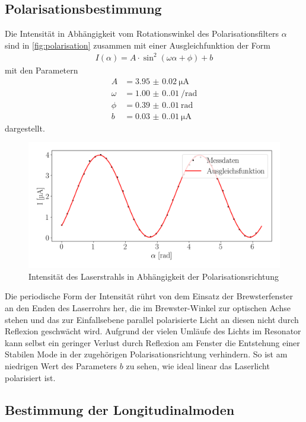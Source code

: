 \subsection{Polarisationsbestimmung}
Die Intensität in Abhängigkeit vom Rotationswinkel des Polarisationsfilters $\alpha$ sind in \autoref{fig:polarisation} zusammen mit einer Ausgleichfunktion der Form
\begin{align}
    I(\alpha)= A\cdot \sin^2{\left(\omega\alpha+\phi\right)}+b
\end{align}
mit den Parametern
\begin{align}
    A &= \SI{3.95(2)}{\micro\ampere} \\
    \omega &= \SI{1.00(0.01)}{\per\radian} \\
    \phi &= \SI{0.39(0.01)}{\radian} \\
    b &= \SI{0.03(0.01)}{\micro\ampere}
\end{align}
dargestellt.
\begin{figure}[H]
    \centering
    \includegraphics[scale=0.55]{Skripte/polarisation.png}
    \caption{Intensität des Laserstrahls in Abhängigkeit der Polarisationsrichtung}\label{fig:polarisation}
\end{figure}
Die periodische Form der Intensität rührt von dem Einsatz der Brewsterfenster an den Enden des Laserrohrs her, die im Brewster-Winkel zur optischen Achse stehen und das zur Einfallsebene parallel polarisierte Licht an diesen nicht durch Reflexion geschwächt wird. Aufgrund der vielen Umläufe des Lichts im Resonator kann selbst ein geringer Verlust durch Reflexion am Fenster die Entstehung einer Stabilen Mode in der zugehörigen Polarisationsrichtung verhindern.
So ist am niedrigen Wert des Parameters $b$ zu sehen, wie ideal linear das Laserlicht polarisiert ist.
\subsection{Bestimmung der Longitudinalmoden}
